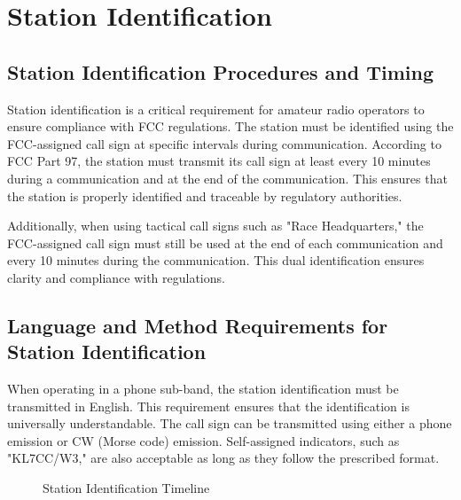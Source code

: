 \section{Station Identification}
\label{sec:station_id}

\subsection*{Station Identification Procedures and Timing}
Station identification is a critical requirement for amateur radio operators to ensure compliance with FCC regulations. The station must be identified using the FCC-assigned call sign at specific intervals during communication. According to FCC Part 97, the station must transmit its call sign at least every 10 minutes during a communication and at the end of the communication. This ensures that the station is properly identified and traceable by regulatory authorities.

Additionally, when using tactical call signs such as "Race Headquarters," the FCC-assigned call sign must still be used at the end of each communication and every 10 minutes during the communication. This dual identification ensures clarity and compliance with regulations.

\subsection*{Language and Method Requirements for Station Identification}
When operating in a phone sub-band, the station identification must be transmitted in English. This requirement ensures that the identification is universally understandable. The call sign can be transmitted using either a phone emission or CW (Morse code) emission. Self-assigned indicators, such as "KL7CC/W3," are also acceptable as long as they follow the prescribed format.

\begin{figure}[h!]
    \centering
    \caption{Station Identification Timeline}
    \label{fig:id_timeline}
\end{figure}

